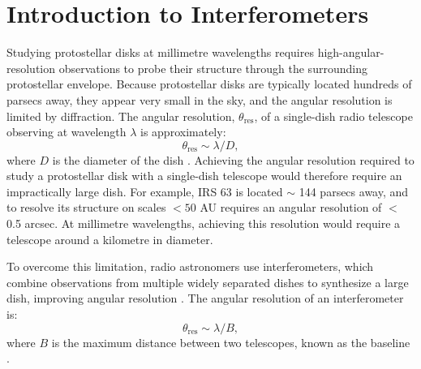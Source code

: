 



\section{Introduction to Interferometers}

Studying protostellar disks at millimetre wavelengths requires high-angular-resolution observations to probe their structure through the surrounding protostellar envelope. Because protostellar disks are typically located hundreds of parsecs away, they appear very small in the sky, and the angular resolution is limited by diffraction. The angular resolution, $\theta_{\text{res}}$, of a single-dish radio telescope observing at wavelength $\lambda$ is approximately:
\begin{equation}
    \theta_{\text{res}}\sim \lambda/D,
\end{equation}
\noindent where $D$ is the diameter of the dish \citep{Monnier}. Achieving the angular resolution required to study a protostellar disk with a single-dish telescope would therefore require an impractically large dish. For example, IRS 63 is located $\sim$ 144 parsecs away, and to resolve its structure on scales $< 50$ AU requires an angular resolution of $<$ 0.5 arcsec. At millimetre wavelengths, achieving this resolution would require a telescope around a kilometre in diameter. 


To overcome this limitation, radio astronomers use interferometers, which combine observations from multiple widely separated dishes to synthesize a large dish, improving angular resolution  \citep{Ludovici2026}. The angular resolution of an interferometer is:
\begin{equation}
    \theta_{\text{res}}\sim \lambda/B, 
\end{equation}
\noindent where $B$ is the maximum distance between two telescopes, known as the baseline \citep{Monnier}. 














